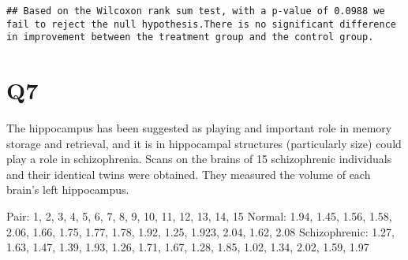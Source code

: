 \documentclass[
]{article}
\newenvironment{Shaded}{\begin{snugshade}}{\end{snugshade}}
\newcommand{\ControlFlowTok}[1]{\textcolor[rgb]{0.13,0.29,0.53}{\textbf{#1}}}
\newcommand{\DecValTok}[1]{\textcolor[rgb]{0.00,0.00,0.81}{#1}}
\newcommand{\FloatTok}[1]{\textcolor[rgb]{0.00,0.00,0.81}{#1}}
\newcommand{\FunctionTok}[1]{\textcolor[rgb]{0.00,0.00,0.00}{#1}}
\newcommand{\NormalTok}[1]{#1}
\newcommand{\OtherTok}[1]{\textcolor[rgb]{0.56,0.35,0.01}{#1}}
\newcommand{\SpecialCharTok}[1]{\textcolor[rgb]{0.00,0.00,0.00}{#1}}
\newcommand{\StringTok}[1]{\textcolor[rgb]{0.31,0.60,0.02}{#1}}
\begin{document}
\begin{Shaded}
\end{Shaded}

\begin{verbatim}
## Based on the Wilcoxon rank sum test, with a p-value of 0.0988 we fail to reject the null hypothesis.There is no significant difference in improvement between the treatment group and the control group.
\end{verbatim}

\hypertarget{q7}{%
\section{Q7}\label{q7}}

The hippocampus has been suggested as playing and important role in
memory storage and retrieval, and it is in hippocampal structures
(particularly size) could play a role in schizophrenia. Scans on the
brains of 15 schizophrenic individuals and their identical twins were
obtained. They measured the volume of each brain's left hippocampus.

Pair: 1, 2, 3, 4, 5, 6, 7, 8, 9, 10, 11, 12, 13, 14, 15 Normal: 1.94,
1.45, 1.56, 1.58, 2.06, 1.66, 1.75, 1.77, 1.78, 1.92, 1.25, 1.923, 2.04,
1.62, 2.08 Schizophrenic: 1.27, 1.63, 1.47, 1.39, 1.93, 1.26, 1.71,
1.67, 1.28, 1.85, 1.02, 1.34, 2.02, 1.59, 1.97
\end{document}
